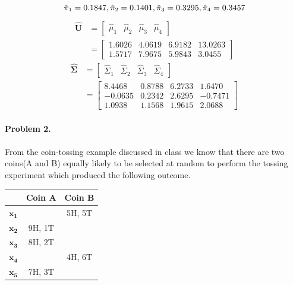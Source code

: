 \documentclass[a4paper]{article}
\begin{document}
\begin{equation}
	\hat{\pi}_1 = 0.1847, \hat{\pi}_2 = 0.1401, \hat{\pi}_3 = 0.3295, \hat{\pi}_4 = 0.3457\\
\end{equation}
\begin{align}
	\mathbf{\hat{U}} &= \begin{bmatrix}
							\hat{\mu}_1 & \hat{\mu}_2 & \hat{\mu}_3 & \hat{\mu}_4 
						\end{bmatrix} \\
					 & = \begin{bmatrix}
							1.6026  &  4.0619  &  6.9182  & 13.0263\\
						    1.5717  &  7.9675  &  5.9843  &  3.0455
						 \end{bmatrix}
\end{align}
\begin{align}
	\mathbf{\hat{\Sigma}} &= \begin{bmatrix}
								\hat{\Sigma}_1 & \hat{\Sigma}_2 & \hat{\Sigma}_3 & \hat{\Sigma}_4 
							 \end{bmatrix} \\
						  & = \begin{bmatrix}
									8.4468  &  0.8788  &  6.2733  &  1.6470 \\
								   -0.0635  &  0.2342  &  2.6295  & -0.7471 \\
								    1.0938  &  1.1568  &  1.9615  &  2.0688
						 	  \end{bmatrix}
\end{align}

\paragraph{Problem 2.} From the coin-tossing example discussed in class we know that there are two coins(A and B) equally likely to be selected at random to perform the tossing experiment which produced the following outcome. \\

\begin{center}
  \begin{tabular}{  r | c | c }
                 & Coin A & Coin B \\ \hline
    $\mathbf{x_1}$ &        & 5H, 5T \\ 
    $\mathbf{x_2}$ & 9H, 1T &        \\ 
    $\mathbf{x_3}$ & 8H, 2T &        \\ 
    $\mathbf{x_4}$ &        & 4H, 6T \\ 
    $\mathbf{x_5}$ & 7H, 3T &        
  \end{tabular}
\end{center}
\end{document}
